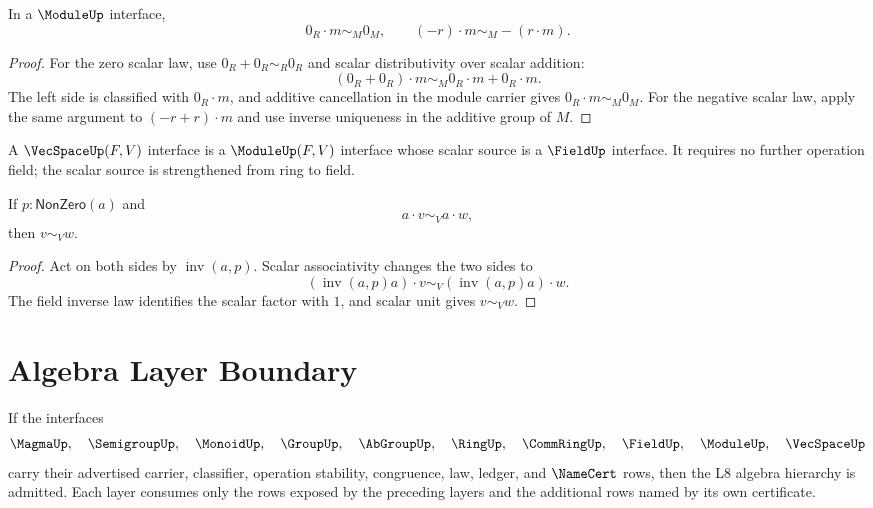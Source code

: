 \begin{theorem}
\label{thm:algebra-spine-module-zero-negative}
In a $\ModuleUp$ interface,
$$
0_R\cdot m\sim_M0_M,
\qquad
(-r)\cdot m\sim_M-(r\cdot m).
$$
\end{theorem}

\begin{proof}
For the zero scalar law, use $0_R+0_R\sim_R0_R$ and scalar distributivity
over scalar addition:
$$
(0_R+0_R)\cdot m\sim_M0_R\cdot m+0_R\cdot m.
$$
The left side is classified with $0_R\cdot m$, and additive cancellation in
the module carrier gives $0_R\cdot m\sim_M0_M$.  For the negative scalar
law, apply the same argument to $(-r+r)\cdot m$ and use inverse uniqueness in
the additive group of $M$.
\end{proof}

\begin{definition}
\label{def:algebra-spine-vecspace}
A $\VecSpaceUp(F,V)$ interface is a $\ModuleUp(F,V)$ interface whose scalar
source is a $\FieldUp$ interface.  It requires no further operation field;
the scalar source is strengthened from ring to field.
\end{definition}

\begin{theorem}
\label{thm:algebra-spine-vecspace-nonzero-scalar-cancellation}
If $p:\mathsf{NonZero}(a)$ and
$$
a\cdot v\sim_Va\cdot w,
$$
then $v\sim_Vw$.
\end{theorem}

\begin{proof}
Act on both sides by $\operatorname{inv}(a,p)$.  Scalar associativity changes
the two sides to
$$
(\operatorname{inv}(a,p)a)\cdot v
\sim_V
(\operatorname{inv}(a,p)a)\cdot w.
$$
The field inverse law identifies the scalar factor with $1$, and scalar unit
gives $v\sim_Vw$.
\end{proof}

\section{Algebra Layer Boundary}
\label{sec:algebra-spine-boundary}

\begin{theorem}
\label{thm:algebra-spine-admission}
If the interfaces
$$
\MagmaUp,\quad
\SemigroupUp,\quad
\MonoidUp,\quad
\GroupUp,\quad
\AbGroupUp,\quad
\RingUp,\quad
\CommRingUp,\quad
\FieldUp,\quad
\ModuleUp,\quad
\VecSpaceUp
$$
carry their advertised carrier, classifier, operation stability, congruence,
law, ledger, and $\NameCert$ rows, then the L8 algebra hierarchy is admitted.
Each layer consumes only the rows exposed by the preceding layers and the
additional rows named by its own certificate.
\end{theorem}

